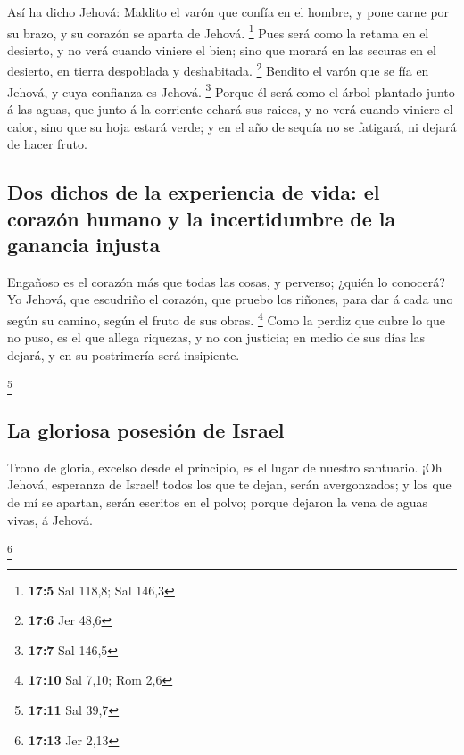  Así ha dicho Jehová: Maldito el varón que confía en el
hombre, y pone carne por su brazo, y su corazón se aparta de Jehová.
\footnote{\textbf{17:5} Sal 118,8; Sal 146,3}  Pues será
como la retama en el desierto, y no verá cuando viniere el bien; sino
que morará en las securas en el desierto, en tierra despoblada y
deshabitada. \footnote{\textbf{17:6} Jer 48,6}  Bendito el
varón que se fía en Jehová, y cuya confianza es Jehová. \footnote{\textbf{17:7}
  Sal 146,5}  Porque él será como el árbol plantado junto
á las aguas, que junto á la corriente echará sus raices, y no verá
cuando viniere el calor, sino que su hoja estará verde; y en el año de
sequía no se fatigará, ni dejará de hacer fruto.

\hypertarget{dos-dichos-de-la-experiencia-de-vida-el-corazuxf3n-humano-y-la-incertidumbre-de-la-ganancia-injusta}{%
\subsection{Dos dichos de la experiencia de vida: el corazón humano y la
incertidumbre de la ganancia
injusta}\label{dos-dichos-de-la-experiencia-de-vida-el-corazuxf3n-humano-y-la-incertidumbre-de-la-ganancia-injusta}}

 Engañoso es el corazón más que todas las cosas, y
perverso; ¿quién lo conocerá?  Yo Jehová, que escudriño
el corazón, que pruebo los riñones, para dar á cada uno según su camino,
según el fruto de sus obras. \footnote{\textbf{17:10} Sal 7,10; Rom 2,6}
 Como la perdiz que cubre lo que no puso, es el que
allega riquezas, y no con justicia; en medio de sus días las dejará, y
en su postrimería será insipiente.

\footnote{\textbf{17:11} Sal 39,7}

\hypertarget{la-gloriosa-posesiuxf3n-de-israel}{%
\subsection{La gloriosa posesión de
Israel}\label{la-gloriosa-posesiuxf3n-de-israel}}

 Trono de gloria, excelso desde el principio, es el lugar
de nuestro santuario.  ¡Oh Jehová, esperanza de Israel!
todos los que te dejan, serán avergonzados; y los que de mí se apartan,
serán escritos en el polvo; porque dejaron la vena de aguas vivas, á
Jehová.

\footnote{\textbf{17:13} Jer 2,13}

